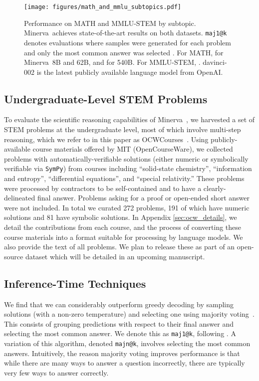 \documentclass{article}
\newcommand{\ourmodel}[0]{{Minerva~}}
\newcommand{\ourbenchmark}[0]{{OCWCourses~}}
\begin{document}
\begin{figure}
\begin{center}
\texttt{[image: figures/math\_and\_mmlu\_subtopics.pdf]}
\end{center}

\caption{\small 
Performance on MATH and MMLU-STEM by subtopic. \ourmodel achieves state-of-the-art results on both datasets. \texttt{maj1@k} denotes evaluations where  samples were generated for each problem and only the most common answer was selected \citep{majority_voting}. For MATH,  for \ourmodel 8B and 62B, and  for 540B. For MMLU-STEM, .
davinci-002 is the latest publicly available language model from OpenAI.
}
\label{fig:math_subtask}
\end{figure}

\subsection{Undergraduate-Level STEM Problems}

To evaluate the scientific reasoning capabilities of \ourmodel\!, we harvested a set of STEM problems at the undergraduate level, most of which involve multi-step reasoning, which we refer to in this paper as \ourbenchmark\!.  Using publicly-available course materials offered by MIT (OpenCourseWare), we collected problems with automatically-verifiable solutions (either numeric or symbolically verifiable via \texttt{SymPy}) from courses including ``solid-state chemistry'', ``information and entropy'', ``differential equations'', and ``special relativity.''  These problems were processed by contractors to be self-contained and to have a clearly-delineated final answer. Problems asking for a proof or open-ended short answer were not included.  In total we curated 272 problems, 191 of which have numeric solutions and 81 have symbolic solutions.  In Appendix \ref{sec:ocw_details}, we detail the contributions from each course, and the process of converting these course materials into a format suitable for processing by language models. We also provide the text of all problems.  We plan to release these as part of an open-source dataset which will be detailed in an upcoming manuscript.


\subsection{Inference-Time Techniques}
\label{sec:advanced_inference}

We find that we can considerably outperform greedy decoding by sampling  solutions (with a non-zero temperature) and selecting one using majority voting~\cite{majority_voting}. This consists of grouping predictions with respect to their final answer and selecting the most common answer. We denote this as \texttt{maj1@k}, following \cite{alphacode}. A variation of this algorithm, denoted \texttt{majn@k}, involves selecting the  most common answers.
Intuitively, the reason majority voting improves performance is that while there are many ways to answer a question incorrectly, there are typically very few ways to answer correctly.
\end{document}
